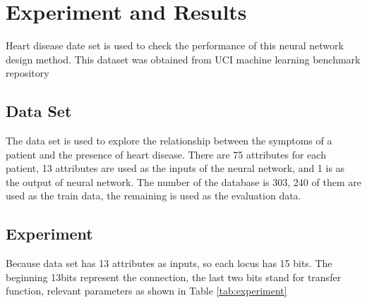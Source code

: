 \documentclass[smallextended]{svjour3}       %
\begin{document}
\begin{multicols}{2}
\begin{center}
\label{plot:offspring}
\end{center}



\section{Experiment and Results}
Heart disease date set is used to check the performance of this neural network
design method. This dataset was obtained from UCI machine learning benchmark
repository
\subsection{Data Set}
  The data set is used to explore the relationship between the symptoms of a
patient and the presence of heart disease. There are 75 attributes for each
patient, 13 attributes are used as the inputs of the neural network, and 1 is as
the output of neural network. The number of the database is 303, 240 of them are
used as the train data, the remaining is used as the evaluation data.

\subsection{Experiment}
Because data set has 13 attributes as inputs, so each locus has 15 bits. The
beginning 13bits represent the connection, the last two bits stand for transfer
function, relevant parameters as shown in Table \ref{tab:experiment}  


\end{multicols}
\end{document}
